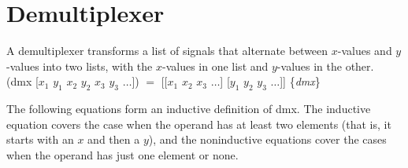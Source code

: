 \begin{exercises}


\end{exercises}

\section{Demultiplexer}
\label{sec:dmx}

A demultiplexer transforms a list of signals that alternate between
$x$-values and $y$-values into two lists,
with the $x$-values in one list and $y$-values in the other.\\
\hspace*{1cm} \textsf{(dmx [$x_1$ $y_1$ $x_2$ $y_2$ $x_3$ $y_3$ $\dots$]) $=$
[[$x_1$ $x_2$ $x_3$ $\dots$] [$y_1$ $y_2$ $y_3$ $\dots$]]}
\hfill \{\emph{dmx}\}

The following equations form an inductive definition of \textsf{dmx}.
The inductive equation covers the case when
the operand has at least two elements
(that is, it starts with an $x$ and then a $y$),
and the noninductive equations cover the cases
when the operand has just one element or none.

